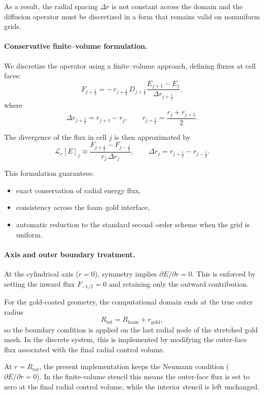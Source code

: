 \documentclass[11pt]{article}
\begin{document}
As a result, the radial spacing $\Delta r$ is not constant across the domain and
the diffusion operator must be discretized in a form that remains valid on
nonuniform grids.

\paragraph{Conservative finite--volume formulation.}
We discretize the operator using a finite--volume approach, defining fluxes at
cell faces:
\begin{equation}
F_{j+\frac12}
=
-\, r_{j+\frac12}\, D_{j+\frac12}
\frac{E_{j+1}-E_j}{\Delta r_{j+\frac12}},
\end{equation}
where
\[
\Delta r_{j+\frac12} = r_{j+1}-r_j,
\qquad
r_{j+\frac12} = \frac{r_j+r_{j+1}}{2}.
\]

The divergence of the flux in cell $j$ is then approximated by
\begin{equation}
\mathcal{L}_r[E]_j
\approx
\frac{F_{j+\frac12}-F_{j-\frac12}}{r_j\,\Delta r_j},
\qquad
\Delta r_j = r_{j+\frac12}-r_{j-\frac12}.
\end{equation}

This formulation guarantees:
\begin{itemize}
\item exact conservation of radial energy flux,
\item consistency across the foam--gold interface,
\item automatic reduction to the standard second--order scheme when the grid
      is uniform.
\end{itemize}

\paragraph{Axis and outer boundary treatment.}
At the cylindrical axis ($r=0$), symmetry implies $\partial E/\partial r = 0$.
This is enforced by setting the inward flux $F_{-1/2}=0$ and retaining only the
outward contribution.

For the gold-coated geometry, the computational domain ends at the true outer radius
\[
R_{\mathrm{tot}} = R_{\mathrm{foam}} + r_{\mathrm{gold}},
\]
so the boundary condition is applied on the last radial node of the stretched gold mesh.
In the discrete system, this is implemented by modifying the outer-face flux associated
with the final radial control volume.

At $r=R_{\mathrm{tot}}$, the present implementation keeps the Neumann condition
($\partial E/\partial r=0$). In the finite-volume stencil this means the outer-face
flux is set to zero at the final radial control volume, while the interior stencil is
left unchanged.
\end{document}
